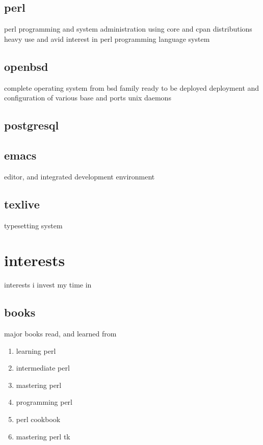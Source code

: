 \documentclass{article}
\begin{document}
\subsection{perl}
perl programming and system administration using core and cpan distributions
heavy use and avid interest in perl programming language system
\subsection{openbsd}
complete operating system from bsd family ready to be deployed
deployment and configuration of various base and ports unix daemons
\subsection{postgresql}
\subsection{emacs}
editor, and integrated development environment
\subsection{texlive}
typesetting system
\section{interests}
interests i invest my time in
\subsection{books}
major books read, and learned from
\begin{enumerate}
\item{learning perl\cite{learning_perl}}
\item{intermediate perl\cite{intermediate_perl}}
\item{mastering perl\cite{mastering_perl}}
\item{programming perl\cite{programming_perl}}
\item{perl cookbook\cite{perl_cookbook}}
\item{mastering perl tk\cite{perl_tk}}
\end{enumerate}
\end{document}
